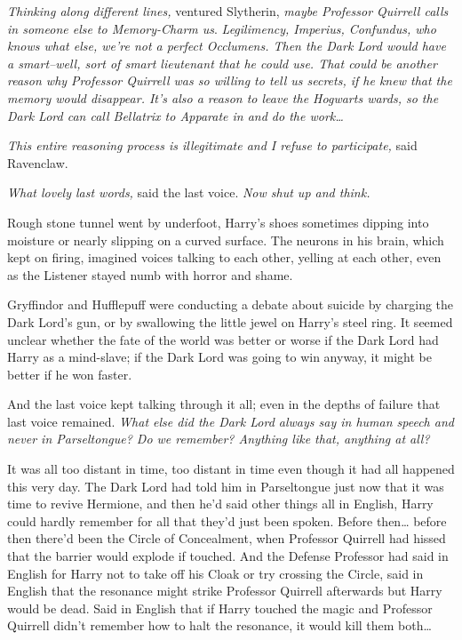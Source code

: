 \emph{Thinking along different lines,} ventured Slytherin, \emph{maybe Professor Quirrell calls in someone else to Memory-Charm us}. \emph{Legilimency, Imperius, Confundus, who knows what else, we're not a perfect Occlumens. Then the Dark Lord would have a smart\---well, sort of smart lieutenant that he could use. That could be another reason why Professor Quirrell was so willing to tell us secrets, if he knew that the memory would disappear. It's also a reason to leave the Hogwarts wards, so the Dark Lord can call Bellatrix to Apparate in and do the work{\ldots}}

\emph{This entire reasoning process is illegitimate and I refuse to participate,} said Ravenclaw.

\emph{What lovely last words,} said the last voice. \emph{Now shut up and think.}

Rough stone tunnel went by underfoot, Harry's shoes sometimes dipping into moisture or nearly slipping on a curved surface. The neurons in his brain, which kept on firing, imagined voices talking to each other, yelling at each other, even as the Listener stayed numb with horror and shame.

Gryffindor and Hufflepuff were conducting a debate about suicide by charging the Dark Lord's gun, or by swallowing the little jewel on Harry's steel ring. It seemed unclear whether the fate of the world was better or worse if the Dark Lord had Harry as a mind-slave; if the Dark Lord was going to win anyway, it might be better if he won faster.

And the last voice kept talking through it all; even in the depths of failure that last voice remained. \emph{What else did the Dark Lord always say in human speech and never in Parseltongue? Do we remember? Anything like that, anything at all?}

It was all too distant in time, too distant in time even though it had all happened this very day. The Dark Lord had told him in Parseltongue just now that it was time to revive Hermione, and then he'd said other things all in English, Harry could hardly remember for all that they'd just been spoken. Before then{\ldots} before then there'd been the Circle of Concealment, when Professor Quirrell had hissed that the barrier would explode if touched. And the Defense Professor had said in English for Harry not to take off his Cloak or try crossing the Circle, said in English that the resonance might strike Professor Quirrell afterwards but Harry would be dead. Said in English that if Harry touched the magic and Professor Quirrell didn't remember how to halt the resonance, it would kill them both{\ldots}

